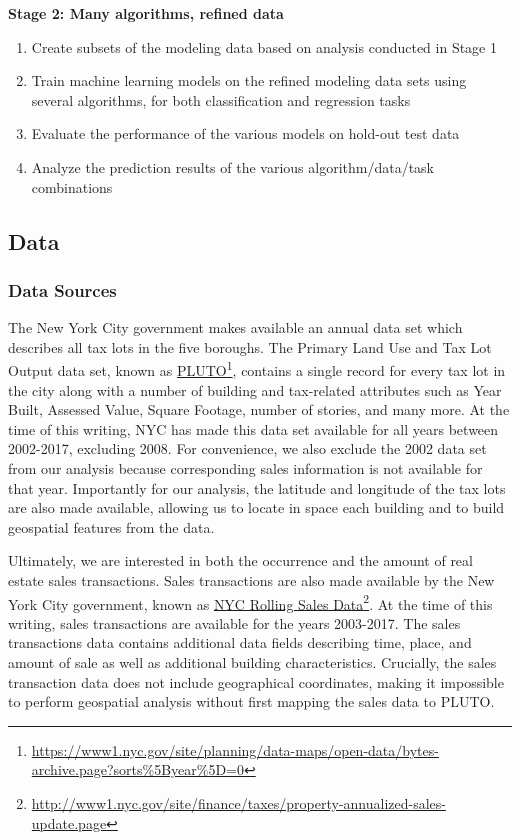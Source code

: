\documentclass[12pt,]{article}
\providecommand{\tightlist}{%
  \setlength{\itemsep}{0pt}\setlength{\parskip}{0pt}}
\let\rmarkdownfootnote\footnote%
\def\footnote{\protect\rmarkdownfootnote}
\begin{document}
\noindent \textbf{Stage 2: Many algorithms, refined data}

\begin{enumerate}
\def\labelenumi{\arabic{enumi})}
\setcounter{enumi}{6}
\tightlist
\item
  Create subsets of the modeling data based on analysis conducted in
  Stage 1
\item
  Train machine learning models on the refined modeling data sets using
  several algorithms, for both classification and regression tasks
\item
  Evaluate the performance of the various models on hold-out test data
\item
  Analyze the prediction results of the various algorithm/data/task
  combinations
\end{enumerate}

\hypertarget{data}{%
\subsection{Data}\label{data}}

\hypertarget{data-sources}{%
\subsubsection{Data Sources}\label{data-sources}}

The New York City government makes available an annual data set which
describes all tax lots in the five boroughs. The Primary Land Use and
Tax Lot Output data set, known as
\href{https://www1.nyc.gov/site/planning/data-maps/open-data/bytes-archive.page?sorts\%5Byear\%5D=0}{PLUTO}\footnote{\url{https://www1.nyc.gov/site/planning/data-maps/open-data/bytes-archive.page?sorts\%5Byear\%5D=0}},
contains a single record for every tax lot in the city along with a
number of building and tax-related attributes such as Year Built,
Assessed Value, Square Footage, number of stories, and many more. At the
time of this writing, NYC has made this data set available for all years
between 2002-2017, excluding 2008. For convenience, we also exclude the
2002 data set from our analysis because corresponding sales information
is not available for that year. Importantly for our analysis, the
latitude and longitude of the tax lots are also made available, allowing
us to locate in space each building and to build geospatial features
from the data.

Ultimately, we are interested in both the occurrence and the amount of
real estate sales transactions. Sales transactions are also made
available by the New York City government, known as
\href{http://www1.nyc.gov/site/finance/taxes/property-annualized-sales-update.page}{NYC
Rolling Sales Data}\footnote{\url{http://www1.nyc.gov/site/finance/taxes/property-annualized-sales-update.page}}.
At the time of this writing, sales transactions are available for the
years 2003-2017. The sales transactions data contains additional data
fields describing time, place, and amount of sale as well as additional
building characteristics. Crucially, the sales transaction data does not
include geographical coordinates, making it impossible to perform
geospatial analysis without first mapping the sales data to PLUTO.
\end{document}
